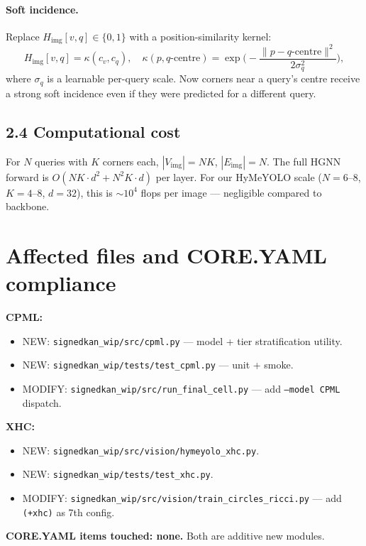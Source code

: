 \documentclass[10pt]{article}
\begin{document}
\paragraph{Soft incidence.} Replace $H_{\text{img}}[v, q] \in \{0, 1\}$
with a position-similarity kernel:
\[
  H_{\text{img}}[v, q] = \kappa(c_v, c_q), \quad
  \kappa(p, q\text{-centre}) = \exp\Big(
    -\frac{\|p - q\text{-centre}\|^2}{2 \sigma_q^2}
  \Big),
\]
where $\sigma_q$ is a learnable per-query scale. Now corners near a
query's centre receive a strong soft incidence even if they were
predicted for a different query.

\subsection*{2.4 Computational cost}

For $N$ queries with $K$ corners each, $|V_{\text{img}}| = N K$,
$|E_{\text{img}}| = N$. The full HGNN forward is
$O(N K \cdot d^2 + N^2 K \cdot d)$ per layer. For our HyMeYOLO scale
($N = 6$--$8$, $K = 4$--$8$, $d = 32$), this is $\sim 10^4$ flops per
image --- negligible compared to backbone.

\section*{Affected files and CORE.YAML compliance}

\textbf{CPML:}
\begin{itemize}
  \item NEW: \texttt{signedkan\_wip/src/cpml.py} --- model + tier
    stratification utility.
  \item NEW: \texttt{signedkan\_wip/tests/test\_cpml.py} --- unit + smoke.
  \item MODIFY: \texttt{signedkan\_wip/src/run\_final\_cell.py} ---
    add \texttt{--model CPML} dispatch.
\end{itemize}

\textbf{XHC:}
\begin{itemize}
  \item NEW: \texttt{signedkan\_wip/src/vision/hymeyolo\_xhc.py}.
  \item NEW: \texttt{signedkan\_wip/tests/test\_xhc.py}.
  \item MODIFY: \texttt{signedkan\_wip/src/vision/train\_circles\_ricci.py} ---
    add \texttt{(+xhc)} as 7th config.
\end{itemize}

\textbf{CORE.YAML items touched: none.} Both are additive new modules.
\end{document}
